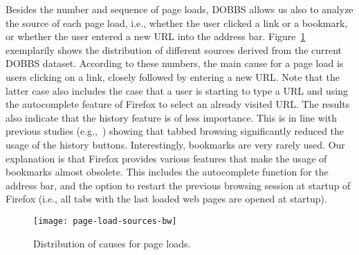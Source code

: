 \documentclass[11pt,fleqn,twoside]{article}
\begin{document}
Besides the number and sequence of page loads, DOBBS allows us also to analyze the source of each page load, i.e., whether the user clicked a link or a bookmark, or whether the user entered a new URL into the address bar. Figure~\ref{fig:page-load-sources-bw} exemplarily shows the distribution of different sources derived from the current DOBBS dataset. According to these numbers, the main cause for a page load is users clicking on a link, closely followed by entering a new URL. Note that the latter case also includes the case that a user is starting to type a URL and using the autocomplete feature of Firefox to select an already visited URL. The results also indicate that the history feature is of less importance. This is in line with previous studies (e.g.,~\cite{Dubroy10AStudyOfTabbed,Zhang11MeasuringWebPage,Huang12NoSearchResult}) showing that tabbed browsing significantly reduced the usage of the history buttons. Interestingly, bookmarks are very rarely used. Our explanation is that Firefox provides 
various features that make the usage of bookmarks almost obsolete. This includes the autocomplete function for the address bar, and the option to restart the previous browsing session at startup of Firefox (i.e., all tabs with the last loaded web pages are opened at startup).
\begin{figure}
 \centering
 \texttt{[image: page-load-sources-bw]}
 \caption{Distribution of causes for page loads.}
 \label{fig:page-load-sources-bw}
\end{figure}
\end{document}

